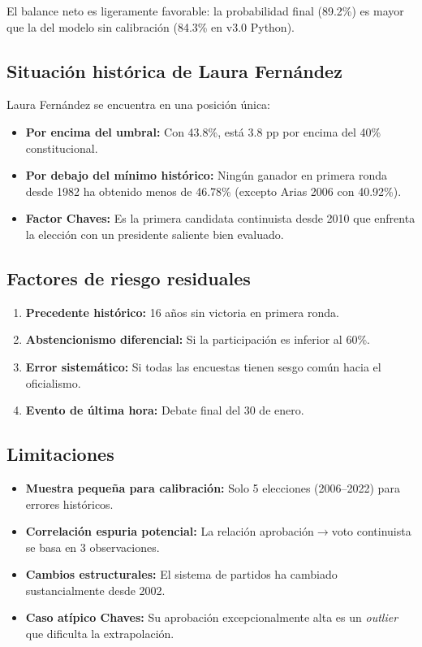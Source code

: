 \documentclass[11pt,a4paper]{article}
\begin{document}
El balance neto es ligeramente favorable: la probabilidad final (89.2\%) es mayor que la del modelo sin calibración (84.3\% en v3.0 Python).

\subsection{Situación histórica de Laura Fernández}

Laura Fernández se encuentra en una posición única:

\begin{itemize}
    \item \textbf{Por encima del umbral:} Con 43.8\%, está 3.8 pp por encima del 40\% constitucional.
    \item \textbf{Por debajo del mínimo histórico:} Ningún ganador en primera ronda desde 1982 ha obtenido menos de 46.78\% (excepto Arias 2006 con 40.92\%).
    \item \textbf{Factor Chaves:} Es la primera candidata continuista desde 2010 que enfrenta la elección con un presidente saliente bien evaluado.
\end{itemize}

\subsection{Factores de riesgo residuales}

\begin{enumerate}
    \item \textbf{Precedente histórico:} 16 años sin victoria en primera ronda.
    \item \textbf{Abstencionismo diferencial:} Si la participación es inferior al 60\%.
    \item \textbf{Error sistemático:} Si todas las encuestas tienen sesgo común hacia el oficialismo.
    \item \textbf{Evento de última hora:} Debate final del 30 de enero.
\end{enumerate}

\subsection{Limitaciones}

\begin{itemize}
    \item \textbf{Muestra pequeña para calibración:} Solo 5 elecciones (2006--2022) para errores históricos.
    \item \textbf{Correlación espuria potencial:} La relación aprobación$\rightarrow$voto continuista se basa en 3 observaciones.
    \item \textbf{Cambios estructurales:} El sistema de partidos ha cambiado sustancialmente desde 2002.
    \item \textbf{Caso atípico Chaves:} Su aprobación excepcionalmente alta es un \textit{outlier} que dificulta la extrapolación.
\end{itemize}
\end{document}
